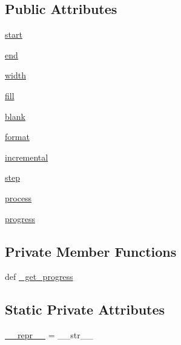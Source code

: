 \subsection*{Public Attributes}
\begin{DoxyCompactItemize}
\item 
\hyperlink{classprogressbar_1_1ProgressBar_afa2d297abaa373dfe45a2036b0d3c123}{start}
\item 
\hyperlink{classprogressbar_1_1ProgressBar_a46470a910a06dc2328d74c9da269f800}{end}
\item 
\hyperlink{classprogressbar_1_1ProgressBar_a818a39d7acf131db44f1ce01c3a1ea98}{width}
\item 
\hyperlink{classprogressbar_1_1ProgressBar_a6688b4a5e97312c48e61f7e3f96eeca0}{fill}
\item 
\hyperlink{classprogressbar_1_1ProgressBar_adb0492e85eacafa26a86c115791e5708}{blank}
\item 
\hyperlink{classprogressbar_1_1ProgressBar_a7c67be1a98afb82bcbc6ddf97d632662}{format}
\item 
\hyperlink{classprogressbar_1_1ProgressBar_aedc9b9f8823b12386c934d1427c35e0a}{incremental}
\item 
\hyperlink{classprogressbar_1_1ProgressBar_a96358aecb3816a174bae4795122f5c1b}{step}
\item 
\hyperlink{classprogressbar_1_1ProgressBar_a9a097a5d47063a94117196891ac4b666}{process}
\item 
\hyperlink{classprogressbar_1_1ProgressBar_abec1e1566520ec7ea9522f56dccaa125}{progress}
\end{DoxyCompactItemize}
\subsection*{Private Member Functions}
\begin{DoxyCompactItemize}
\item 
def \hyperlink{classprogressbar_1_1ProgressBar_af11b2da67d3c42a65defe21b4abf7351}{\_\-get\_\-progress}
\end{DoxyCompactItemize}
\subsection*{Static Private Attributes}
\begin{DoxyCompactItemize}
\item 
\hyperlink{classprogressbar_1_1ProgressBar_aef4ad61d3b7ec3f1b8514ee563268d4c}{\_\-\_\-repr\_\-\_\-} = \_\-\_\-str\_\-\_\-
\end{DoxyCompactItemize}


